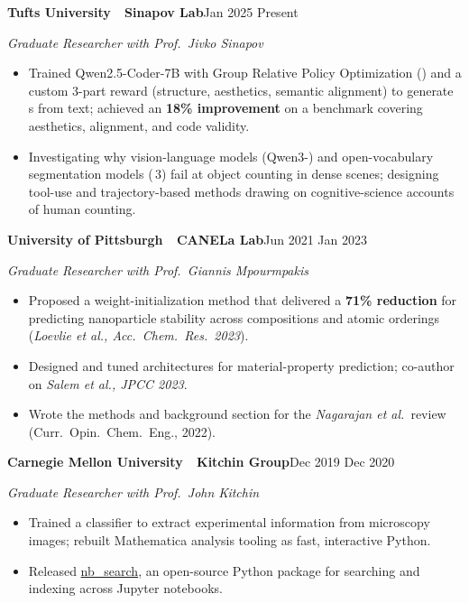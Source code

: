 \documentclass[10pt,letterpaper]{article}
\newif\ifshortversion
\newcommand{\sansfam}{\sffamily}
\newcommand{\monofam}{\ttfamily}
\newcommand{\bdash}{\,\textemdash\,}
\newcommand{\datestamp}[1]{{\sansfam\footnotesize\color{meta}\figureversion{lf}#1}}
\newcommand{\role}[2]{%
  \filbreak%
  \par\vspace{1pt}%
  \noindent\textbf{#1}\hfill\datestamp{#2}\par\nopagebreak}
\newcommand{\sub}[1]{\noindent\textit{\footnotesize\color{meta} #1}\par\nopagebreak}
\newcommand{\acro}[1]{\textls[80]{#1}}
\begin{document}
\role{Tufts University \bdash{} Sinapov Lab}{Jan 2025 \textendash{} Present}
\sub{Graduate Researcher with Prof.\ Jivko Sinapov}
\begin{itemize}
  \item Trained Qwen2.5-Coder-7B with Group Relative Policy Optimization (\acro{GRPO}) and a custom 3-part reward (structure, aesthetics, semantic alignment) to generate \acro{SVG}s from text; achieved an \textbf{18\% improvement} on a benchmark covering aesthetics, alignment, and code validity.
  \item Investigating why vision-language models (Qwen3-\acro{VL}) and open-vocabulary segmentation models (\acro{SAM}\,3) fail at object counting in dense scenes; designing tool-use and trajectory-based methods drawing on cognitive-science accounts of human counting.
\end{itemize}

\ifshortversion\else
\role{University of Pittsburgh \bdash{} CANELa Lab}{Jun 2021 \textendash{} Jan 2023}
\sub{Graduate Researcher with Prof.\ Giannis Mpourmpakis}
\begin{itemize}
  \item Proposed a weight-initialization method that delivered a \textbf{71\% \acro{RMSE} reduction} for predicting nanoparticle stability across compositions and atomic orderings (\emph{Loevlie et al., Acc.\ Chem.\ Res.\ 2023}).
  \item Designed and tuned \acro{ML} architectures for material-property prediction; co-author on \emph{Salem et al., JPCC 2023}.
  \item Wrote the \acro{ML} methods and background section for the \emph{Nagarajan et al.}\ review (Curr.\ Opin.\ Chem.\ Eng., 2022).
\end{itemize}

\role{Carnegie Mellon University \bdash{} Kitchin Group}{Dec 2019 \textendash{} Dec 2020}
\sub{Graduate Researcher with Prof.\ John Kitchin}
\begin{itemize}
  \item Trained a \acro{CNN} classifier to extract experimental information from microscopy images; rebuilt Mathematica analysis tooling as fast, interactive Python.
  \item Released \href{https://tinyurl.com/yzpperdc}{\monofam nb\_search}, an open-source Python package for searching and indexing across Jupyter notebooks.
\end{itemize}
\fi
\end{document}
